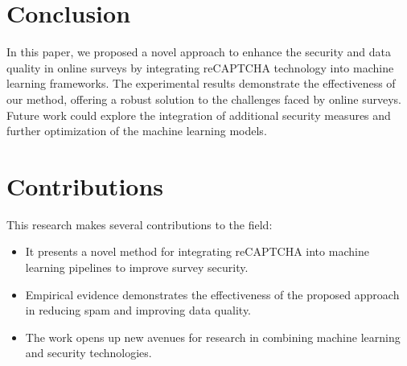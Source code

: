 \documentclass{article}
\begin{document}
\section{Conclusion}
In this paper, we proposed a novel approach to enhance the security and data quality in online surveys by integrating reCAPTCHA technology into machine learning frameworks. The experimental results demonstrate the effectiveness of our method, offering a robust solution to the challenges faced by online surveys. Future work could explore the integration of additional security measures and further optimization of the machine learning models.

\section{Contributions}
This research makes several contributions to the field:
\begin{itemize}
    \item It presents a novel method for integrating reCAPTCHA into machine learning pipelines to improve survey security.
    \item Empirical evidence demonstrates the effectiveness of the proposed approach in reducing spam and improving data quality.
    \item The work opens up new avenues for research in combining machine learning and security technologies.
\end{itemize}



\end{document}
